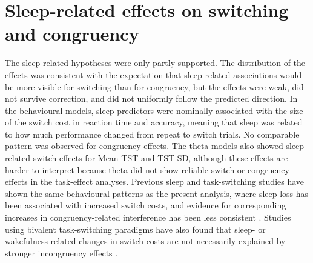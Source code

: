 \documentclass[12pt,a4paper]{report}
\begin{document}
\section{Sleep-related effects on switching and congruency}

The sleep-related hypotheses were only partly supported. The distribution of the effects was consistent with the expectation that sleep-related associations would be more visible for switching than for congruency, but the effects were weak, did not survive correction, and did not uniformly follow the predicted direction. In the behavioural models, sleep predictors were nominally associated with the size of the switch cost in reaction time and accuracy, meaning that sleep was related to how much performance changed from repeat to switch trials. No comparable pattern was observed for congruency effects. The theta models also showed sleep-related switch effects for Mean TST and TST SD, although these effects are harder to interpret because theta did not show reliable switch or congruency effects in the task-effect analyses. Previous sleep and task-switching studies have shown the same behavioural patterns as the present analysis, where sleep loss has been associated with increased switch costs, and evidence for corresponding increases in congruency-related interference has been less consistent \parencite{bratzke2009constantwakefulness,couyoumdjian2010switchingsleep,heuer2004totalsleepdeprivation,slama2018sleepswitching}. Studies using bivalent task-switching paradigms have also found that sleep- or wakefulness-related changes in switch costs are not necessarily explained by stronger incongruency effects \parencite{bratzke2009constantwakefulness,heuer2004totalsleepdeprivation}.
\end{document}
